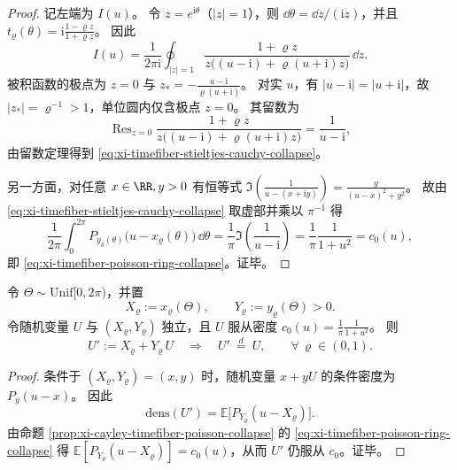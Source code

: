 \begin{proof}
记左端为 \(I(u)\)。
令 \(z=e^{\mathrm{i}\theta}\)（\(|z|=1\)），则 \(\dd\theta=\dd z/(\mathrm{i}z)\)，并且
\(
t_{\varrho}(\theta)=\mathrm{i}\frac{1-\varrho z}{1+\varrho z}
\)。
因此
\[
I(u)
=\frac{1}{2\pi\mathrm{i}}\oint_{|z|=1}
\frac{1+\varrho z}{z\bigl((u-\mathrm{i})+\varrho(u+\mathrm{i})z\bigr)}\,\dd z.
\]
被积函数的极点为 \(z=0\) 与 \(z_\ast=-\frac{u-\mathrm{i}}{\varrho(u+\mathrm{i})}\)。
对实 \(u\)，有 \(|u-\mathrm{i}|=|u+\mathrm{i}|\)，故 \(|z_\ast|=\varrho^{-1}>1\)，单位圆内仅含极点 \(z=0\)。
其留数为
\[
\operatorname{Res}_{z=0}\frac{1+\varrho z}{z\bigl((u-\mathrm{i})+\varrho(u+\mathrm{i})z\bigr)}
=\frac{1}{u-\mathrm{i}},
\]
由留数定理得到 \eqref{eq:xi-timefiber-stieltjes-cauchy-collapse}。
\par
另一方面，对任意 \(x\in\RR,y>0\) 有恒等式
\(
\Im\!\left(\frac{1}{u-(x+\mathrm{i}y)}\right)=\frac{y}{(u-x)^2+y^2}
\)。
故由 \eqref{eq:xi-timefiber-stieltjes-cauchy-collapse} 取虚部并乘以 \(\pi^{-1}\) 得
\[
\frac{1}{2\pi}\int_{0}^{2\pi}P_{y_{\varrho}(\theta)}\!\bigl(u-x_{\varrho}(\theta)\bigr)\,\dd\theta
=\frac{1}{\pi}\Im\!\left(\frac{1}{u-\mathrm{i}}\right)
=\frac{1}{\pi}\frac{1}{1+u^2}
=c_0(u),
\]
即 \eqref{eq:xi-timefiber-poisson-ring-collapse}。证毕。
\end{proof}

\begin{corollary}\label{cor:xi-timefiber-cauchy-fixedpoint}
令 \(\Theta\sim\mathrm{Unif}[0,2\pi)\)，并置
\[
X_\varrho:=x_\varrho(\Theta),\qquad Y_\varrho:=y_\varrho(\Theta)>0.
\]
令随机变量 \(U\) 与 \((X_\varrho,Y_\varrho)\) 独立，且 \(U\) 服从密度 \(c_0(u)=\frac{1}{\pi}\frac{1}{1+u^2}\)。
则
\[
U':=X_\varrho+Y_\varrho\,U
\quad\Longrightarrow\quad
U'\ \stackrel{d}{=}\ U,
\qquad \forall\,\varrho\in(0,1).
\]
\end{corollary}

\begin{proof}
条件于 \((X_\varrho,Y_\varrho)=(x,y)\) 时，随机变量 \(x+yU\) 的条件密度为 \(P_y(u-x)\)。
因此
\[
\mathrm{dens}(U')=\mathbb{E}\bigl[P_{Y_\varrho}(u-X_\varrho)\bigr].
\]
由命题 \ref{prop:xi-cayley-timefiber-poisson-collapse} 的 \eqref{eq:xi-timefiber-poisson-ring-collapse} 得
\(
\mathbb{E}[P_{Y_\varrho}(u-X_\varrho)]=c_0(u)
\)，从而 \(U'\) 仍服从 \(c_0\)。证毕。
\end{proof}

